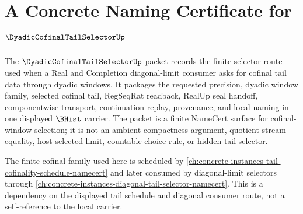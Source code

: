 \chapter{A Concrete Naming Certificate for $\DyadicCofinalTailSelectorUp$}
\label{ch:concrete-instances-dyadic-cofinal-tail-selector-namecert}

The $\DyadicCofinalTailSelectorUp$ packet records the finite selector route used when a Real and Completion diagonal-limit consumer asks for cofinal tail data through dyadic windows. It packages the requested precision, dyadic window family, selected cofinal tail, RegSeqRat readback, RealUp seal handoff, componentwise transport, continuation replay, provenance, and local naming in one displayed $\BHist$ carrier. The packet is a finite NameCert surface for cofinal-window selection; it is not an ambient compactness argument, quotient-stream equality, host-selected limit, countable choice rule, or hidden tail selector.

The finite cofinal family used here is scheduled by \autoref{ch:concrete-instances-tail-cofinality-schedule-namecert} and later consumed by diagonal-limit selectors through \autoref{ch:concrete-instances-diagonal-tail-selector-namecert}. This is a dependency on the displayed tail schedule and diagonal consumer route, not a self-reference to the local carrier.

